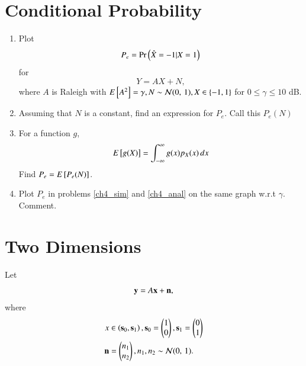 \documentclass[journal,12pt,twocolumn]{IEEEtran}
\renewcommand\thesection{\arabic{section}}
\begin{document}
\section{Conditional Probability}
\begin{enumerate}[label=\thesection.\arabic*
,ref=\thesection.\theenumi]

\item
	\label{ch4_sim}
	Plot 
	\begin{equation}
	P_e = \Pr\left(\hat{X} = -1|X=1\right)
	\end{equation}
	for 
	\begin{equation}
	Y = AX+N,
	\end{equation}
	where $A$ is Raleigh with $E{}\left[A^2\right] = \gamma, N \sim \mathcal{N}(0,\,1), X \in \left\{-1,1\right\}$ for $0 \le \gamma \le 10$ dB.
	
\item
	Assuming that $N$ is a constant, find an expression for $P_e$.  Call this $P_e(N)$
	
\item
	\label{ch4_anal}
	For a function $g$,
	\begin{equation}
	E{}\left[g(X)\right] = \int_{-\infty}^{\infty}g(x)p_{X}(x)\, dx
	\end{equation}
	Find $P_e = E{}\left[P_e(N)\right]$.
	
\item
	Plot $P_e$ in problems \ref{ch4_sim} and \ref{ch4_anal} on the same graph w.r.t $\gamma$.  Comment.

\end{enumerate}

\section{Two Dimensions}
Let 
\begin{equation}
\mathbf{y} = A\mathbf{x} + \mathbf{n},
\end{equation}
where 
\begin{align}
x &\in \left(\mathbf{s}_0,\mathbf{s}_1\right), 
\mathbf{s}_0 = 
\begin{pmatrix}
1 
\\
0
\end{pmatrix},
\mathbf{s}_1 = 
\begin{pmatrix}
0 
\\
1
\end{pmatrix}
\\
\mathbf{n} &= 
\begin{pmatrix}
n_1
\\
n_2
\end{pmatrix},
n_1,n_2 \sim \mathcal{N}(0,\,1).
\end{align}
%
\end{document}
